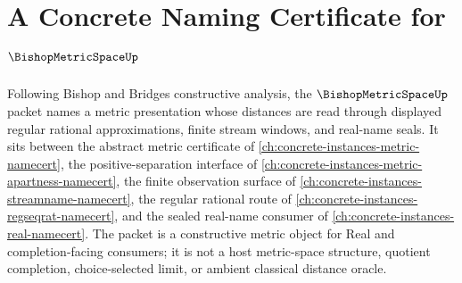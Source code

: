 \chapter{A Concrete Naming Certificate for $\BishopMetricSpaceUp$}
\label{ch:concrete-instances-bishop-metric-space-namecert}

Following Bishop and Bridges constructive analysis, the $\BishopMetricSpaceUp$ packet names a metric presentation whose distances are read through displayed regular rational approximations, finite stream windows, and real-name seals. It sits between the abstract metric certificate of \autoref{ch:concrete-instances-metric-namecert}, the positive-separation interface of \autoref{ch:concrete-instances-metric-apartness-namecert}, the finite observation surface of \autoref{ch:concrete-instances-streamname-namecert}, the regular rational route of \autoref{ch:concrete-instances-regseqrat-namecert}, and the sealed real-name consumer of \autoref{ch:concrete-instances-real-namecert}. The packet is a constructive metric object for Real and completion-facing consumers; it is not a host metric-space structure, quotient completion, choice-selected limit, or ambient classical distance oracle.

